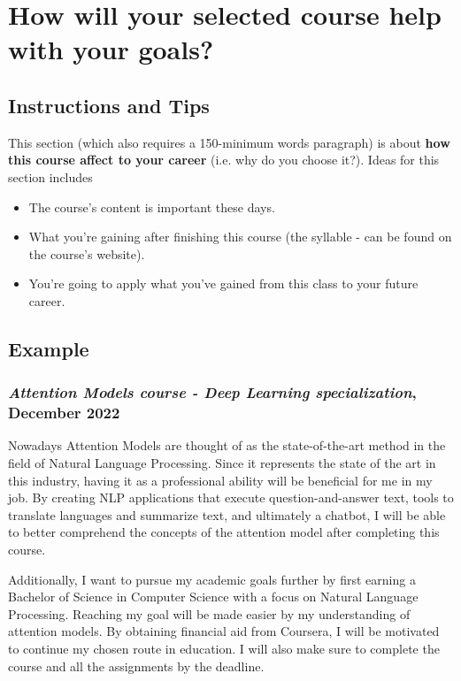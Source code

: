 \chapter{How will your selected course help with your goals?}

\section{Instructions and Tips}
This section (which also requires a 150-minimum words paragraph) is about \textbf{how this course affect to your career} (i.e. why do you choose it?). Ideas for this section includes
\begin{itemize}
\item The course's content is important these days.
\item What you're gaining after finishing this course (the syllable - can be found on the course's website).
\item You're going to apply what you've gained from this class to your future career.
\end{itemize}

\section{Example}
\subsection{\textit{Attention Models course - Deep Learning specialization}, December 2022}
Nowadays Attention Models are thought of as the state-of-the-art method in the field of Natural Language Processing. Since it represents the state of the art in this industry, having it as a professional ability will be beneficial for me in my job. By creating NLP applications that execute question-and-answer text, tools to translate languages and summarize text, and ultimately a chatbot, I will be able to better comprehend the concepts of the attention model after completing this course. 

Additionally, I want to pursue my academic goals further by first earning a Bachelor of Science in Computer Science with a focus on Natural Language Processing. Reaching my goal will be made easier by my understanding of attention models. By obtaining financial aid from Coursera, I will be motivated to continue my chosen route in education. I will also make sure to complete the course and all the assignments by the deadline. 

